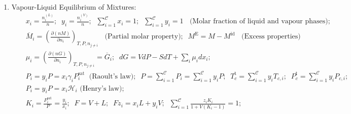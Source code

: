 \documentclass[12pts,a4paper,amsmath,amssymb,floatfix]{article}%
\newcommand{\frc}{\displaystyle\frac}
\newcommand{\Partial}[3][error]{\left(\frc{\partial #1}{\partial #2}\right)_{#3}}
\newcommand{\mfr}[3][error]{#1_{#2}^{\left(#3\right)}}
\newcommand{\summation}[3][error]{\sum\limits_{#2}^{#3}#1}
\begin{document}
\begin{enumerate}[1)]
\item Vapour-Liquid Equilibrium of Mixtures:
  \begin{eqnarray}
    && x_{i} = \frc{\mfr[n]{i}{L}}{n};\;\; y_{i} = \frc{\mfr[n]{i}{V}}{n};\;\; \summation[x_{i}]{i=1}{\mathcal{C}} = 1;\;\;\summation[y_{i}]{i=1}{\mathcal{C}} = 1\;\; \text{ (Molar fraction of liquid and vapour phases)}; \nonumber \\
    && \overline{M}_{i} = \Partial[(nM)]{n_{i}}{T,P,n_{j\ne i}}\;\; \text{ (Partial molar property)};\;\; M^{\text{E}} = M - M^{\text{id}}\;\;\text{ (Excess properties)} \nonumber \\
    && \mu_{i} = \Partial[(nG)]{n_{i}}{T,P,n_{j\ne i}} = \overline{G}_{i}; \;\; dG = VdP -SdT + \summation[\mu_{i}dx_{i}]{i}{}; \nonumber \\
    && P_{i} = y_{i}P = x_{i}\gamma_{i}P_{i}^{\text{sat}}\; \text{ (Raoult's law)};\;\;P = \summation[P_{i}]{i=1}{\mathcal{C}} = \summation[y_{i}P]{i=1}{\mathcal{C}};\;\; T_{c}^{\text{t}} = \summation[y_{i}T_{c,i}]{i=1}{\mathcal{C}};\;\; P_{c}^{\text{t}} = \summation[y_{i}P_{c,i}]{i=1}{\mathcal{C}}; \nonumber \\
    && P_{i} = y_{i}P = x_{i}\mathcal{H}_{i} \text{ (Henry's law)}; \nonumber \\
    && K_{i} = \frc{P_{i}^{\text{sat}}}{P} = \frc{y_{i}}{x_{i}};\;\; F = V + L;\;\; Fz_{i} = x_{i}L + y_{i}V; \;\; \summation[\frc{z_{i}K_{i}}{1+V\left(K_{i}-1\right)}]{i=1}{\mathcal{C}} = 1;\nonumber 
  \end{eqnarray}


\end{enumerate}
\end{document}
